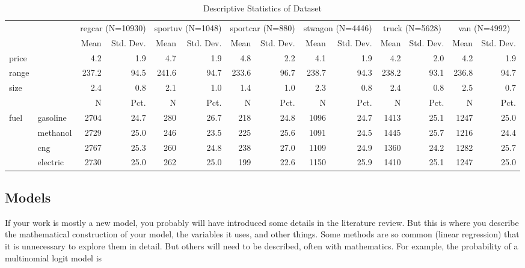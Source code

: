 \documentclass[3p, authoryear]{elsarticle} %
\begin{document}
\begin{table}

\caption{\label{tab:datasummary}Descriptive Statistics of Dataset}
\centering
\begin{tabular}[t]{llrrrrrrrrrrrr}
\toprule
\multicolumn{2}{c}{ } & \multicolumn{2}{c}{regcar (N=10930)} & \multicolumn{2}{c}{sportuv (N=1048)} & \multicolumn{2}{c}{sportcar (N=880)} & \multicolumn{2}{c}{stwagon (N=4446)} & \multicolumn{2}{c}{truck (N=5628)} & \multicolumn{2}{c}{van (N=4992)} \\
\cmidrule(l{3pt}r{3pt}){3-4} \cmidrule(l{3pt}r{3pt}){5-6} \cmidrule(l{3pt}r{3pt}){7-8} \cmidrule(l{3pt}r{3pt}){9-10} \cmidrule(l{3pt}r{3pt}){11-12} \cmidrule(l{3pt}r{3pt}){13-14}
  &    & Mean & Std. Dev. & Mean  & Std. Dev.  & Mean   & Std. Dev.   & Mean    & Std. Dev.    & Mean     & Std. Dev.     & Mean      & Std. Dev.     \\
\midrule
price &  & 4.2 & 1.9 & 4.7 & 1.9 & 4.8 & 2.2 & 4.1 & 1.9 & 4.2 & 2.0 & 4.2 & 1.9\\
range &  & 237.2 & 94.5 & 241.6 & 94.7 & 233.6 & 96.7 & 238.7 & 94.3 & 238.2 & 93.1 & 236.8 & 94.7\\
size &  & 2.4 & 0.8 & 2.1 & 1.0 & 1.4 & 1.0 & 2.3 & 0.8 & 2.4 & 0.8 & 2.5 & 0.7\\
\midrule
 &  & N & Pct. & N & Pct. & N & Pct. & N & Pct. & N & Pct. & N & Pct.\\
fuel & gasoline & 2704 & 24.7 & 280 & 26.7 & 218 & 24.8 & 1096 & 24.7 & 1413 & 25.1 & 1247 & 25.0\\
 & methanol & 2729 & 25.0 & 246 & 23.5 & 225 & 25.6 & 1091 & 24.5 & 1445 & 25.7 & 1216 & 24.4\\
 & cng & 2767 & 25.3 & 260 & 24.8 & 238 & 27.0 & 1109 & 24.9 & 1360 & 24.2 & 1282 & 25.7\\
 & electric & 2730 & 25.0 & 262 & 25.0 & 199 & 22.6 & 1150 & 25.9 & 1410 & 25.1 & 1247 & 25.0\\
\bottomrule
\end{tabular}
\end{table}

\hypertarget{models}{%
\subsection{Models}\label{models}}

If your work is mostly a new model, you probably will have introduced some
details in the literature review. But this is where you describe the
mathematical construction of your model, the variables it uses, and other
things. Some methods are so common (linear regression) that it is unnecessary to
explore them in detail. But others will need to be described, often with
mathematics. For example, the probability of a multinomial logit model is
\end{document}
